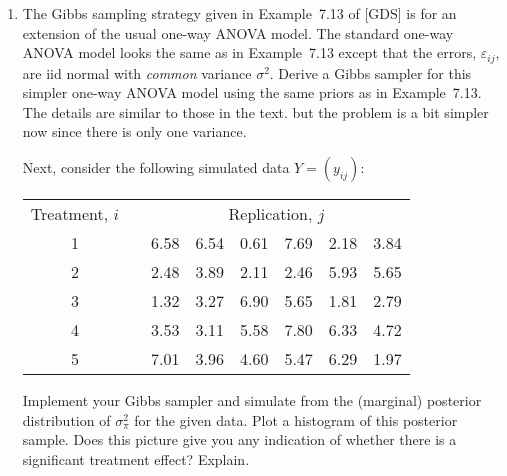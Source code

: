 \documentclass[a4paper,12pt]{article}
\newcommand{\eps}{\varepsilon}
\begin{document}
\begin{enumerate}
\item The Gibbs sampling strategy given in Example~7.13 of [GDS] is for an extension of the usual one-way ANOVA model.  The standard one-way ANOVA model looks the same as in Example~7.13 except that the errors, $\eps_{ij}$, are iid normal with \emph{common} variance $\sigma^2$.  Derive a Gibbs sampler for this simpler one-way ANOVA model using the same priors as in Example~7.13.  The details are similar to those in the text. but the problem is a bit simpler now since there is only one variance.  

Next, consider the following simulated data $Y=(y_{ij})$: 
\begin{center}
\begin{tabular}{cccccccc}
Treatment, $i$ & & \multicolumn{6}{c}{Replication, $j$} \\
\cline{1-1} \cline{3-8} 
1 & & 6.58 & 6.54 & 0.61 & 7.69 & 2.18 & 3.84 \\
2 & & 2.48 & 3.89 & 2.11 & 2.46 & 5.93 & 5.65 \\
3 & & 1.32 & 3.27 & 6.90 & 5.65 & 1.81 & 2.79 \\
4 & & 3.53 & 3.11 & 5.58 & 7.80 & 6.33 & 4.72 \\
5 & & 7.01 & 3.96 & 4.60 & 5.47 & 6.29 & 1.97 \\
\hline
\end{tabular}
\end{center}
Implement your Gibbs sampler and simulate from the (marginal) posterior distribution of $\sigma_\pi^2$ for the given data.  Plot a histogram of this posterior sample.  Does this picture give you any indication of whether there is a significant treatment effect?  Explain.  



\end{enumerate}
\end{document}
